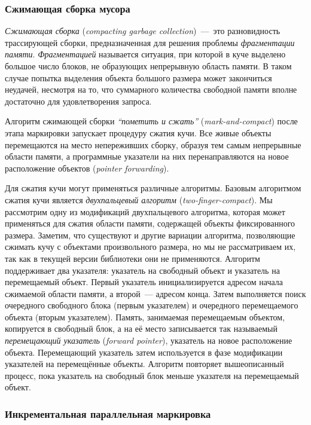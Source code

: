\subsubsection{Сжимающая сборка мусора}
\label{sec:two-finger-compact}

\emph{Сжимающая сборка} (\emph{compacting garbage collection})~---~это разновидность 
трассирующей сборки, предназначенная для решения проблемы \emph{фрагментации памяти}. 
\emph{Фрагментацией} называется ситуация, при которой в куче выделено большое число блоков, 
не образующих непрерывную область памяти. 
В таком случае попытка выделения объекта большого размера может закончиться неудачей, 
несмотря на то, что суммарного количества свободной памяти вполне достаточно для 
удовлетворения запроса. 

Алгоритм сжимающей сборки \emph{``пометить и сжать''} 
(\emph{mark-and-compact}) 
после этапа маркировки запускает процедуру сжатия кучи. 
Все живые объекты перемещаются на место непереживших сборку, образуя тем самым непрерывные 
области памяти, а программные указатели на них перенаправляются на новое 
расположение объектов (\emph{pointer forwarding}). 

Для сжатия кучи могут применяться различные алгоритмы. 
Базовым алгоритмом сжатия кучи является \emph{двухпальцевый алгоритм} 
(\emph{two-finger-compact}). 
Мы рассмотрим одну из модификаций двухпальцевого алгоритма, которая может применяться 
для сжатия области памяти, содержащей объекты фиксированного размера. 
Заметим, что существуют и другие вариации алгоритма, позволяющие сжимать кучу с объектами 
произвольного размера, но мы не рассматриваем их, так как в текущей версии библиотеки они 
не применяются. 
Алгоритм поддерживает два указателя: указатель на свободный объект и 
указатель на перемещаемый объект. 
Первый указатель инициализируется адресом начала сжимаемой области памяти, 
а второй~--- адресом конца. 
Затем выполняется поиск очередного свободного блока (первым указателем) и 
очередного перемещаемого объекта (вторым указателем). 
Память, занимаемая перемещаемым объектом, копируется в свободный блок, 
а на её место записывается так называемый \emph{перемещающий указатель} 
(\emph{forward pointer}), указатель на новое расположение объекта. 
Перемещающий указатель затем используется в фазе модификации указателей на 
перемещённые объекты. 
Алгоритм повторяет вышеописанный процесс, пока указатель на свободный блок 
меньше указателя на перемещаемый объект. 


\subsubsection{Инкрементальная параллельная маркировка}
\label{sec:inc_marking}

